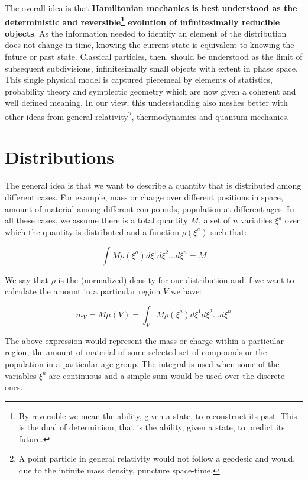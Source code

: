 \documentclass[11pt]{article}
\begin{document}
The overall idea is that \textbf{Hamiltonian mechanics is best understood as the deterministic and reversible\footnote{By reversible we mean the ability, given a state, to reconstruct its past. This is the dual of determinism, that is the ability, given a state, to predict its future.} evolution of infinitesimally reducible objects}. As the information needed to identify an element of the distribution does not change in time, knowing the current state is equivalent to knowing the future or past state. Classical particles, then, should be understood as the limit of subsequent subdivisions, infinitesimally small objects with extent in phase space. This single physical model is captured piecemeal by elements of statistics, probability theory and symplectic geometry which are now given a coherent and well defined meaning. In our view, this understanding also meshes better with other ideas from general relativity\footnote{A point particle in general relativity would not follow a geodesic and would, due to the infinite mass density, puncture space-time.}, thermodynamics and quantum mechanics.



\section{Distributions}

The general idea is that we want to describe a quantity that is distributed among different cases. For example, mass or charge over different positions in space, amount of material among different compounds, population at different ages. In all these cases, we assume there is a total quantity $M$, a set of $n$ variables $\xi^a$ over which the quantity is distributed and a function $\rho(\xi^a)$ such that:

\begin{equation}
\int M \rho(\xi^a) d\xi^1 d\xi^2 ... d\xi^n = M
\end{equation}

We say that $\rho$ is the (normalized) density for our distribution and if we want to calculate the amount in a particular region $V$ we have:

\begin{equation}
m_V = M \mu(V) =\int_V M \rho(\xi^a) d\xi^1 d\xi^2 ... d\xi^n
\end{equation}

The above expression would represent the mass or charge within a particular region, the amount of material of some selected set of compounds or the population in a particular age group. The integral is used when some of the variables $\xi^a$ are continuous and a simple sum would be used over the discrete ones.
\end{document}
